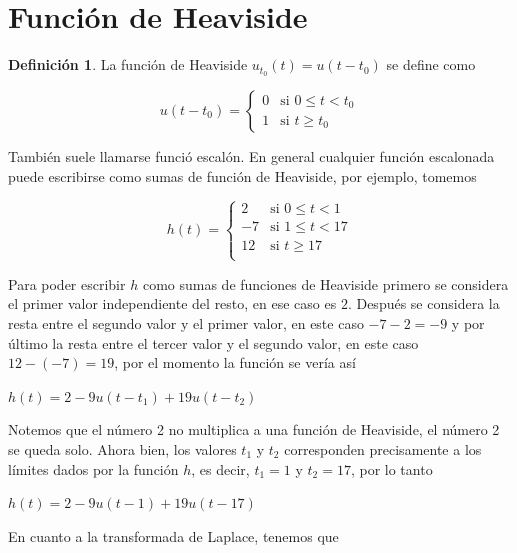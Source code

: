 \documentclass{article}
\theoremstyle{plain}
\theoremstyle{definition}
\newtheorem{defin}[thm]{Definición}
\begin{document}
\newpage


\section{Función de Heaviside}


\begin{defin}La función de Heaviside $u_{t_0}(t) = u(t-t_0)$ se define como
\end{defin}

\begin{equation*}
u(t-t_0) =
\begin{cases}
0 & \text{si $0 \leq t < t_0$}\\
1 & \text{si $t \geq t_0$}
\end{cases}
\end{equation*}

También suele llamarse funció escalón. En general cualquier función escalonada puede escribirse como sumas de función de Heaviside, por ejemplo, tomemos

\begin{equation*}
h(t) =
\begin{cases}
2 & \text{si $0 \leq t < 1$}\\
-7 & \text{si $1 \leq t < 17$} \\
12 & \text{si $t \geq 17$} \\
\end{cases}
\end{equation*}

Para poder escribir $h$ como sumas de funciones de Heaviside primero se considera el primer valor independiente del resto, en ese caso es $2$. Después se considera la resta entre el segundo valor y el primer valor, en este caso $-7-2 = -9$ y por último la resta entre el tercer valor y el segundo valor, en este caso $12-(-7) =19$, por el momento la función se vería así


\begin{center}
$h(t) = 2-9u(t-t_1)+19u(t-t_2)$
\end{center}

Notemos que el número 2 no multiplica a una función de Heaviside, el número 2 se queda solo. Ahora bien, los valores $t_1$ y $t_2$ corresponden precisamente a los límites dados por la función $h$, es decir, $t_1= 1$ y $t_2=17$, por lo tanto

\begin{center}
$h(t) = 2-9u(t-1)+19u(t-17)$
\end{center}


En cuanto a la transformada de Laplace, tenemos que
\end{document}
